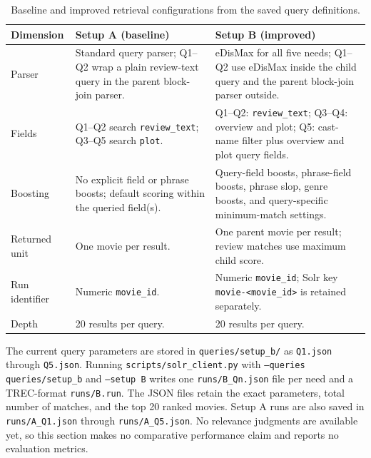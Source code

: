 \begin{table}[t]
\centering
\setlength{\tabcolsep}{4pt}
\caption{Baseline and improved retrieval configurations from the saved query definitions.}
\label{tab:setup-ab}
\footnotesize
\begin{tabular}{p{1.3cm}p{2.0cm}p{3.6cm}}
\hline
Dimension & Setup A (baseline) & Setup B (improved) \\
\hline
Parser & Standard query parser; Q1--Q2 wrap a plain review-text query in the parent block-join parser. & eDisMax for all five needs; Q1--Q2 use eDisMax inside the child query and the parent block-join parser outside. \\
Fields & Q1--Q2 search \texttt{review\_text}; Q3--Q5 search \texttt{plot}. & Q1--Q2: \texttt{review\_text}; Q3--Q4: overview and plot; Q5: cast-name filter plus overview and plot query fields. \\
Boosting & No explicit field or phrase boosts; default scoring within the queried field(s). & Query-field boosts, phrase-field boosts, phrase slop, genre boosts, and query-specific minimum-match settings. \\
Returned unit & One movie per result. & One parent movie per result; review matches use maximum child score. \\
Run identifier & Numeric \texttt{movie\_id}. & Numeric \texttt{movie\_id}; Solr key \texttt{movie-<movie\_id>} is retained separately. \\
Depth & 20 results per query. & 20 results per query. \\
\hline
\end{tabular}
\end{table}

The current query parameters are stored in \texttt{queries/setup\_b/} as
\texttt{Q1.json} through \texttt{Q5.json}. Running
\texttt{scripts/solr\_client.py} with \texttt{--queries queries/setup\_b} and
\texttt{--setup B} writes one \texttt{runs/B\_Qn.json} file per need and a
TREC-format \texttt{runs/B.run}.
The JSON files retain the exact parameters, total number of matches, and the top
20 ranked movies. Setup A runs are also saved in \texttt{runs/A\_Q1.json} through
\texttt{runs/A\_Q5.json}. No relevance judgments are available yet, so this section
makes no comparative performance claim and reports no evaluation metrics.

